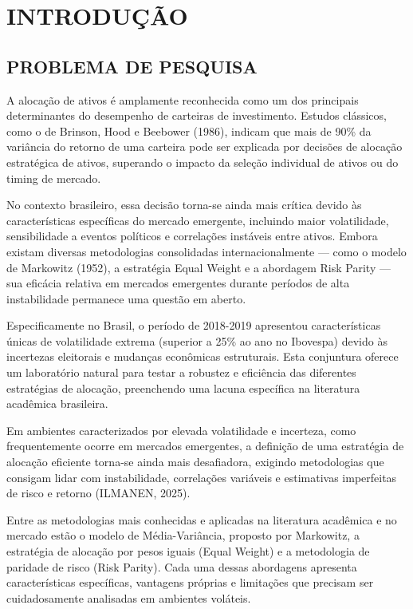 
\chapter{INTRODUÇÃO}

\section{PROBLEMA DE PESQUISA}

A alocação de ativos é amplamente reconhecida como um dos principais determinantes do desempenho de carteiras de investimento. Estudos clássicos, como o de Brinson, Hood e Beebower (1986), indicam que mais de 90\% da variância do retorno de uma carteira pode ser explicada por decisões de alocação estratégica de ativos, superando o impacto da seleção individual de ativos ou do timing de mercado.

No contexto brasileiro, essa decisão torna-se ainda mais crítica devido às características específicas do mercado emergente, incluindo maior volatilidade, sensibilidade a eventos políticos e correlações instáveis entre ativos. Embora existam diversas metodologias consolidadas internacionalmente --- como o modelo de Markowitz (1952), a estratégia Equal Weight e a abordagem Risk Parity --- sua eficácia relativa em mercados emergentes durante períodos de alta instabilidade permanece uma questão em aberto.

Especificamente no Brasil, o período de 2018-2019 apresentou características únicas de volatilidade extrema (superior a 25\% ao ano no Ibovespa) devido às incertezas eleitorais e mudanças econômicas estruturais. Esta conjuntura oferece um laboratório natural para testar a robustez e eficiência das diferentes estratégias de alocação, preenchendo uma lacuna específica na literatura acadêmica brasileira.

Em ambientes caracterizados por elevada volatilidade e incerteza, como frequentemente ocorre em mercados emergentes, a definição de uma estratégia de alocação eficiente torna-se ainda mais desafiadora, exigindo metodologias que consigam lidar com instabilidade, correlações variáveis e estimativas imperfeitas de risco e retorno (ILMANEN, 2025).

Entre as metodologias mais conhecidas e aplicadas na literatura acadêmica e no mercado estão o modelo de Média-Variância, proposto por Markowitz, a estratégia de alocação por pesos iguais (Equal Weight) e a metodologia de paridade de risco (Risk Parity). Cada uma dessas abordagens apresenta características específicas, vantagens próprias e limitações que precisam ser cuidadosamente analisadas em ambientes voláteis.

